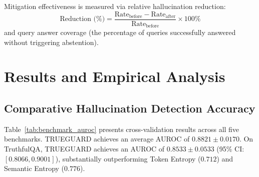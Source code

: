 \documentclass[journal]{IEEEtran}
\begin{document}
Mitigation effectiveness is measured via relative hallucination reduction:
\begin{equation}
    \text{Reduction (\%)} = \frac{\text{Rate}_{\text{before}} - \text{Rate}_{\text{after}}}{\text{Rate}_{\text{before}}} \times 100\%
\end{equation}
and query answer coverage (the percentage of queries successfully answered without triggering abstention).


\section{Results and Empirical Analysis}

\subsection{Comparative Hallucination Detection Accuracy}
Table~\ref{tab:benchmark_auroc} presents cross-validation results across all five benchmarks. TRUEGUARD achieves an average AUROC of $0.8821 \pm 0.0170$. On TruthfulQA, TRUEGUARD achieves an AUROC of $0.8533 \pm 0.0533$ (95\% CI: $[0.8066, 0.9001]$), substantially outperforming Token Entropy ($0.712$) and Semantic Entropy ($0.776$).

\begin{table}[!t]
\caption{Cross-Validation Performance Across Benchmarks (5-Fold CV)}
\label{tab:benchmark_auroc}
\centering
\renewcommand{\arraystretch}{1.1}
\small
{}
\end{table}
\end{document}
